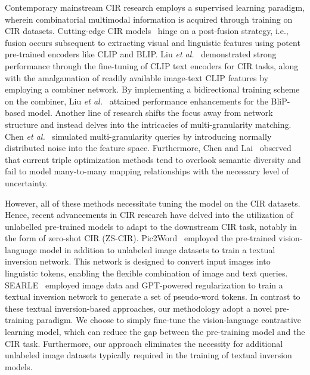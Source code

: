 \documentclass[10pt,twocolumn,letterpaper]{article}
\begin{document}
Contemporary mainstream CIR research employs a supervised learning paradigm, wherein combinatorial multimodal information is acquired through training on CIR datasets. Cutting-edge CIR models~\cite{liu2021image, lee2021cosmo, baldrati2022effective, liu2023bi} hinge on a post-fusion strategy, i.e.,  fusion occurs subsequent to extracting visual and linguistic features using potent pre-trained encoders like CLIP and BLIP. Liu \textit{et al.}~\cite{liu2021image} demonstrated strong performance through the fine-tuning of CLIP text encoders for CIR tasks, along with the amalgamation of readily available image-text CLIP features by employing a combiner network. By implementing a bidirectional training scheme on the combiner, Liu \textit{et al.}~\cite{liu2023bi} attained performance enhancements for the BliP-based model. Another line of research shifts the focus away from network structure and instead delves into the intricacies of multi-granularity matching. Chen \textit{et al.}~\cite{chen2022composed} simulated multi-granularity queries by introducing normally distributed noise into the feature space. Furthermore, Chen and Lai~\cite{chen2023ranking} observed that current triple optimization methods tend to overlook semantic diversity and fail to model many-to-many mapping relationships with the necessary level of uncertainty. 

However, all of these methods necessitate tuning the model on the CIR datasets. Hence, recent advancements in CIR research have delved into the utilization of unlabelled pre-trained models to adapt to the downstream CIR task, notably in the form of zero-shot CIR (ZS-CIR). Pic2Word~\cite{saito2023pic2word} employed the pre-trained vision-language model in addition to unlabeled image datasets to train a textual inversion network. This network is designed to convert input images into linguistic tokens, enabling the flexible combination of image and text queries. SEARLE~\cite{Baldrati_2023_ICCV} employed image data and GPT-powered regularization to train a textual inversion network to generate a set of pseudo-word tokens. In contrast to these textual inversion-based approaches, our methodology adopt a novel pre-training paradigm. We choose to simply fine-tune the vision-language contrastive learning model, which can reduce the gap between the pre-training model and the CIR task. Furthermore, our approach eliminates the necessity for additional unlabeled image datasets typically required in the training of textual inversion models.
\end{document}
